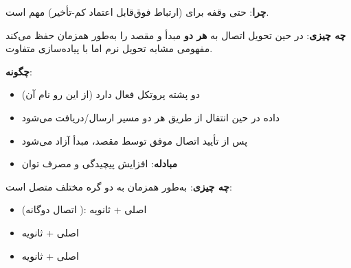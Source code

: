 

\textbf{چرا}: حتی وقفه  برای  (ارتباط فوق‌قابل اعتماد کم-تأخیر) مهم است.

\textbf{چه چیزی}:  در حین تحویل اتصال به \textbf{هر دو} مبدأ و مقصد را به‌طور همزمان حفظ می‌کند  مفهومی مشابه تحویل نرم  اما با پیاده‌سازی متفاوت.


\textbf{چگونه}:

\begin{itemize}
\tightlist
\item
   دو پشته پروتکل فعال دارد (از این رو نام آن)
\item
  داده در حین انتقال از طریق هر دو مسیر ارسال/\allowbreak{}دریافت می‌شود
\item
  پس از تأیید اتصال موفق توسط مقصد، مبدأ آزاد می‌شود
\item
  \textbf{مبادله}: افزایش پیچیدگی و مصرف توان 
\end{itemize}


\textbf{چه چیزی}:  به‌طور همزمان به دو گره مختلف متصل است:

\begin{itemize}
\tightlist
\item
   (اتصال دوگانه ):  اصلی +  ثانویه
\item
   اصلی +  ثانویه
\item
   اصلی +  ثانویه
\end{itemize}




